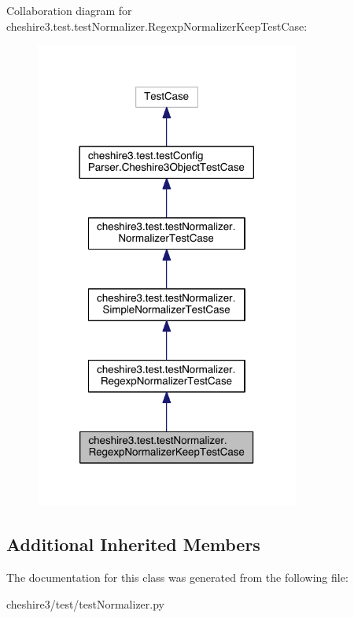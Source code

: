 Collaboration diagram for cheshire3.\-test.\-test\-Normalizer.\-Regexp\-Normalizer\-Keep\-Test\-Case\-:
\nopagebreak
\begin{figure}[H]
\begin{center}
\leavevmode
\includegraphics[width=246pt]{classcheshire3_1_1test_1_1test_normalizer_1_1_regexp_normalizer_keep_test_case__coll__graph}
\end{center}
\end{figure}
\subsection*{Additional Inherited Members}


The documentation for this class was generated from the following file\-:\begin{DoxyCompactItemize}
\item 
cheshire3/test/test\-Normalizer.\-py\end{DoxyCompactItemize}
